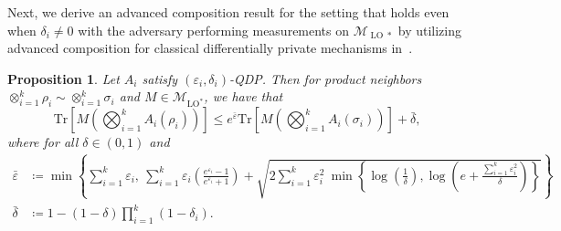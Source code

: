 \documentclass[11pt]{article}
\def\Tr{\mathrm{Tr}}
\theoremstyle{plain}
\newtheorem{proposition}[theo]{Proposition}
\theoremstyle{remark}
\begin{document}
Next, we derive an advanced composition result for the setting that holds even when $\delta_i \neq 0$ with the adversary performing measurements on ${\mathcal{M}}_{\operatorname{LO}*}$ by utilizing advanced composition for classical differentially private mechanisms in~. 




\begin{proposition}\label{prop:all_local_advanced}
    Let $A_i$ satisfy $(\varepsilon_i, \delta_i)$-QDP. Then for product neighbors $ \otimes_{i=1}^k \rho_i \sim \otimes_{i=1}^k \sigma_i$ and $M\in {\mathcal{M}}_{\operatorname{LO}^*}$, we have that 
    \begin{equation}
        \Tr\!\left[ M \left( \bigotimes_{i=1}^k A_i(\rho_i) \right) \right] \leq e^{\bar{\varepsilon}} \Tr\!\left[ M \left( \bigotimes_{i=1}^k A_i(\sigma_i) \right) \right] + \bar{\delta},
    \end{equation}
where for all $\delta \in (0,1)$ and
\begin{align}
    \bar{\varepsilon} & \coloneqq  \min \left\{ \sum_{i=1}^k \varepsilon_i , \  \sum_{i=1}^k \varepsilon_i \left( \frac{e^{\varepsilon_i}-1}{e^{\varepsilon_i} +1} \right) + \sqrt{2  \sum_{i=1}^k {\varepsilon_i^2} \ \min\left\{\log\!\left( \frac{1}{\delta} \right), \log\!\left(e+ \frac{ \sum_{i=1}^k \varepsilon_i^2 }{\delta} \right)  \right\}} \right \} \\ 
    \bar{\delta} & \coloneqq 1- (1-\delta) \prod_{i=1}^k (1-\delta_i).
\end{align}
\end{proposition}
\end{document}
